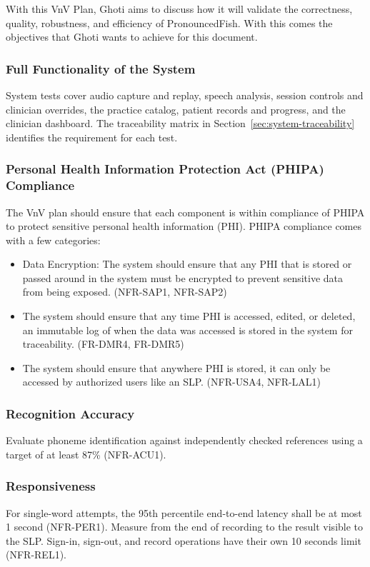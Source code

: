 \documentclass[12pt, titlepage]{article}
\newcommand{\PhonemeAccuracyTarget}{87\%}
\newcommand{\WordLatencyLimit}{1 second}
\newcommand{\WordLatencyPercentile}{95th percentile}
\newcommand{\ServerResponseLimit}{10 seconds}
\begin{document}
With this VnV Plan, Ghoti aims to discuss how it will validate the correctness, quality, robustness, and efficiency of PronouncedFish. With this comes the objectives that Ghoti wants to achieve for this document. 

\subsubsection{Full Functionality of the System}
System tests cover audio capture and replay, speech analysis, session
controls and clinician overrides, the practice catalog, patient records and
progress, and the clinician dashboard. The traceability matrix in
Section~\ref{sec:system-traceability} identifies the requirement for each test.

\subsubsection{Personal Health Information Protection Act (PHIPA) Compliance}
The VnV plan should ensure that each component is within compliance of PHIPA to protect sensitive personal health information (PHI). PHIPA compliance comes with a few categories:
\begin{itemize}
    \item Data Encryption: The system should ensure that any PHI that is stored or passed around in the system must be encrypted to prevent sensitive data from being exposed. (NFR-SAP1, NFR-SAP2)
    \item The system should ensure that any time PHI is accessed, edited, or deleted, an immutable log of when the data was accessed is stored in the system for traceability. (FR-DMR4, FR-DMR5)
    \item The system should ensure that anywhere PHI is stored, it can only be accessed by authorized users like an SLP. (NFR-USA4, NFR-LAL1)
\end{itemize}

\subsubsection{Recognition Accuracy}
Evaluate phoneme identification against independently checked references
using a target of at least \PhonemeAccuracyTarget{} (NFR-ACU1).

\subsubsection{Responsiveness}
For single-word attempts, the \WordLatencyPercentile{} end-to-end latency
shall be at most \WordLatencyLimit{} (NFR-PER1). Measure from the end of
recording to the result visible to the SLP. Sign-in, sign-out, and record
operations have their own \ServerResponseLimit{} limit (NFR-REL1).
\end{document}

